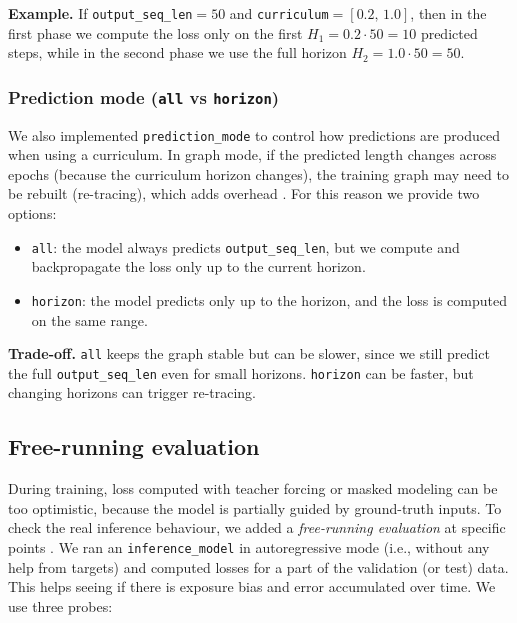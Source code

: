 \textbf{Example.} If \texttt{output\_seq\_len}$=50$ and \texttt{curriculum}$=[0.2,\,1.0]$, then in the first phase we compute the loss only on the first $H_1=0.2\cdot 50=10$ predicted steps, while in the second phase we use the full horizon $H_2=1.0\cdot 50=50$.


\subsubsection{Prediction mode (\texttt{all} vs \texttt{horizon})}
\label{sec:prediction_mode}

We also implemented \texttt{prediction\_mode} to control how predictions are produced when using a curriculum. In graph mode, if the predicted length changes across epochs (because the curriculum horizon changes), the training graph may need to be rebuilt (re-tracing), which adds overhead \cite{tensorflow_tffunction_guide}. For this reason we provide two options:
\begin{itemize}
  \item \texttt{all}: the model always predicts \texttt{output\_seq\_len}, but we compute and backpropagate the loss only up to the current horizon.
  \item \texttt{horizon}: the model predicts only up to the horizon, and the loss is computed on the same range.
\end{itemize}

\noindent\textbf{Trade-off.} \texttt{all} keeps the graph stable but can be slower, since we still predict the full \texttt{output\_seq\_len} even for small horizons. \texttt{horizon} can be faster, but changing horizons can trigger re-tracing.

\subsection{Free-running evaluation}
\label{sec:freerun}

During training, loss computed with teacher forcing or masked modeling can be too optimistic, because the model is partially guided by ground-truth inputs. To check the real inference behaviour, we added a \emph{free-running evaluation} at specific points \cite{bengio2015scheduled}. We ran an \texttt{inference\_model} in autoregressive mode (i.e., without any help from targets) and computed losses for a part of the validation (or test) data. This helps seeing if there is exposure bias and error accumulated over time. We use three probes:



